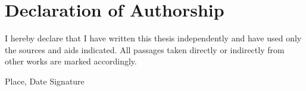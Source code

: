 
\chapter*{Declaration of Authorship}

I hereby declare that I have written this thesis independently and have used
only the sources and aids indicated. All passages taken directly or indirectly
from other works are marked accordingly.

\vspace{2cm}

\noindent Place, Date \hfill Signature